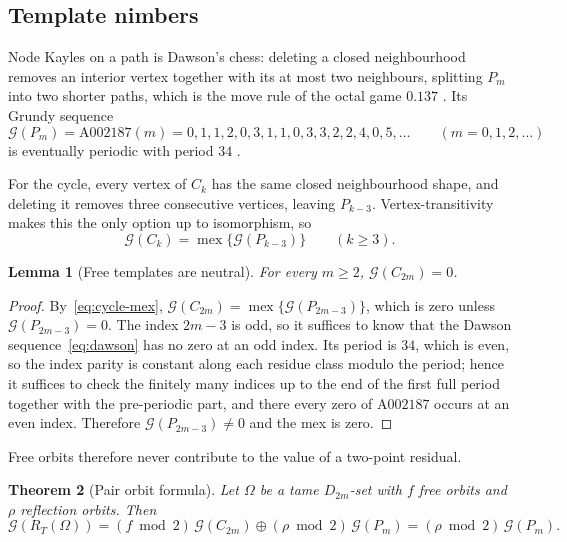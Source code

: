 \documentclass[11pt]{article}
\newtheorem{theorem}{Theorem}[section]
\newtheorem{lemma}[theorem]{Lemma}
\theoremstyle{definition}
\theoremstyle{remark}
\newcommand{\Grundy}{\mathcal{G}}
\newcommand{\Cyc}{C}
\DeclareMathOperator{\mex}{mex}
\begin{document}
\subsection{Template nimbers}

Node Kayles on a path is Dawson's chess: deleting a closed neighbourhood removes an interior vertex
together with its at most two neighbours, splitting $P_m$ into two shorter paths, which is the move
rule of the octal game $0.137$ \cite{WinningWays}. Its Grundy sequence
\begin{equation}
  \Grundy(P_m)=\mathrm{A}002187(m)=0,1,1,2,0,3,1,1,0,3,3,2,2,4,0,5,\dots\qquad(m=0,1,2,\dots)
  \label{eq:dawson}
\end{equation}
is eventually periodic with period $34$ \cite{OEIS-A002187}.

For the cycle, every vertex of $\Cyc_k$ has the same closed neighbourhood shape, and deleting it
removes three consecutive vertices, leaving $P_{k-3}$. Vertex-transitivity makes this the only
option up to isomorphism, so
\begin{equation}
  \Grundy(\Cyc_k)=\mex\{\Grundy(P_{k-3})\}\qquad(k\ge3).
  \label{eq:cycle-mex}
\end{equation}

\begin{lemma}[Free templates are neutral]
\label{lem:cycle-zero}
For every $m\ge2$, $\Grundy(\Cyc_{2m})=0$.
\end{lemma}

\begin{proof}
By~\eqref{eq:cycle-mex}, $\Grundy(\Cyc_{2m})=\mex\{\Grundy(P_{2m-3})\}$, which is zero unless
$\Grundy(P_{2m-3})=0$. The index $2m-3$ is odd, so it suffices to know that the Dawson
sequence~\eqref{eq:dawson} has no zero at an odd index. Its period is $34$, which is even, so the
index parity is constant along each residue class modulo the period; hence it suffices to check the
finitely many indices up to the end of the first full period together with the pre-periodic part,
and there every zero of $\mathrm{A}002187$ occurs at an even index. Therefore
$\Grundy(P_{2m-3})\ne0$ and the mex is zero.
\end{proof}

Free orbits therefore never contribute to the value of a two-point residual.

\begin{theorem}[Pair orbit formula]
\label{thm:pair-orbit}
Let $\Omega$ be a tame $D_{2m}$-set with $f$ free orbits and $\rho$ reflection orbits. Then
\begin{equation}
  \Grundy(R_T(\Omega))
  =(f\bmod2)\,\Grundy(\Cyc_{2m})\oplus(\rho\bmod2)\,\Grundy(P_m)
  =(\rho\bmod2)\,\Grundy(P_m).
  \label{eq:pair-orbit}
\end{equation}
\end{theorem}
\end{document}
